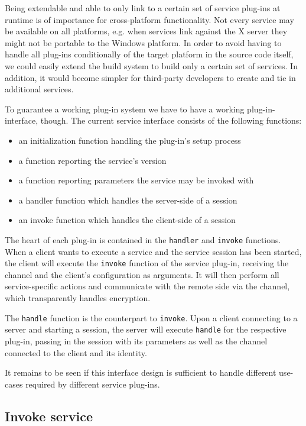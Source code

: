 Being extendable and able to only link to a certain set of service plug-ins at runtime is of importance for cross-platform functionality.
Not every service may be available on all platforms, e.g. when services link against the X server they might not be portable to the Windows platform.
In order to avoid having to handle all plug-ins conditionally of the target platform in the source code itself, we could easily extend the build system to build only a certain set of services.
In addition, it would become simpler for third-party developers to create and tie in additional services.

\medskip

To guarantee a working plug-in system we have to have a working plug-in-interface, though.
The current service interface consists of the following functions:
\begin{itemize}
    \item an initialization function handling the plug-in's setup process
    \item a function reporting the service's version
    \item a function reporting parameters the service may be invoked with
    \item a handler function which handles the server-side of a session
    \item an invoke function which handles the client-side of a session
\end{itemize}

The heart of each plug-in is contained in the \lstinline{handler} and \lstinline{invoke} functions.
When a client wants to execute a service and the service session has been started, the client will execute the \lstinline{invoke} function of the service plug-in, receiving the channel and the client's configuration as arguments.
It will then perform all service-specific actions and communicate with the remote side via the channel, which transparently handles encryption.

The \lstinline{handle} function is the counterpart to \lstinline{invoke}.
Upon a client connecting to a server and starting a session, the server will execute \lstinline{handle} for the respective plug-in, passing in the session with its parameters as well as the channel connected to the client and its identity.

It remains to be seen if this interface design is sufficient to handle different use-cases required by different service plug-ins.

\subsection{Invoke service}
\label{sec:invoke-service}

